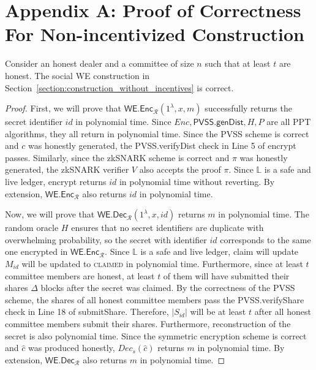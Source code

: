 \section{Appendix A: Proof of Correctness For Non-incentivized Construction}
\begin{theorem}\label{thm:correctness_hm}
    Consider an honest dealer and a committee of size $n$ such that at least $t$ are honest.
    The social WE construction in Section~\ref{section:construction_without_incentives} is correct.
\end{theorem}
\begin{proof}
    First, we will prove that $\textsf{WE.Enc}_\mathcal{R}(1^{\lambda}, x, m)$ successfully returns the secret identifier $id$ in polynomial time.
    Since $Enc, \textsf{PVSS.genDist}, H, P$ are all PPT algorithms, they all return in polynomial time.
    Since the PVSS scheme is correct and $c$ was honestly generated, the \textsf{PVSS.verifyDist} check in Line 5 of \textsf{encrypt} passes.
    Similarly, since the zkSNARK scheme is correct and $\pi$ was honestly generated, the zkSNARK verifier $V$ also accepts the proof $\pi$.
    Since $\mathbb{L}$ is a safe and live ledger, \textsf{encrypt} returns $id$ in polynomial time without reverting.
    By extension, $\textsf{WE.Enc}_\mathcal{R}$ also returns $id$ in polynomial time.

    Now, we will prove that $\textsf{WE.Dec}_\mathcal{R}(1^{\lambda}, x, id)$ returns $m$ in polynomial time.
    The random oracle $H$ ensures that no secret identifiers are duplicate with overwhelming probability, so the secret with identifier $id$ corresponds to the same one encrypted in $\textsf{WE.Enc}_\mathcal{R}$.
    Since $\mathbb{L}$ is a safe and live ledger, \textsf{claim} will update $M_{id}$ will be updated to \textsc{claimed} in polynomial time.
    Furthermore, since at least $t$ committee members are honest, at least $t$ of them will have submitted their shares $\Delta$ blocks after the secret was claimed.
    By the correctness of the PVSS scheme, the shares of all honest committee members pass the \textsf{PVSS.verifyShare} check in Line 18 of \textsf{submitShare}.
    Therefore, $|S_{id}|$ will be at least $t$ after all honest committee members submit their shares.
    Furthermore, reconstruction of the secret is also polynomial time.
    Since the symmetric encryption scheme is correct and $\hat{c}$ was produced honestly, $Dec_s(\hat{c})$ returns $m$ in polynomial time.
    By extension, $\textsf{WE.Dec}_\mathcal{R}$ also returns $m$ in polynomial time.
\end{proof}

